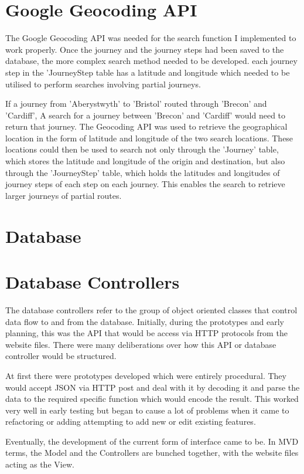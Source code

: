 \section{Google Geocoding API}
	The Google Geocoding API\cite{google_geocoding_api} was needed for the search function I implemented to work properly. Once the journey and the journey steps had been saved to the database, the more complex search method needed to be developed. each journey step in the 'Journey\textunderscore Step table has a latitude and longitude which needed to be utilised to perform searches involving partial journeys. 
	
	If a journey from 'Aberystwyth' to 'Bristol' routed through 'Brecon' and 'Cardiff', A search for a journey between 'Brecon' and 'Cardiff' would need to return that journey. The Geocoding API was used to retrieve the geographical location in the form of latitude and longitude of the two search locations. These locations could then be used to search not only through the 'Journey' table, which stores the latitude and longitude of the origin and destination, but also through the 'Journey\textunderscore Step' table, which holds the latitudes and longitudes of journey steps of each step on each journey. This enables the search to retrieve larger journeys of partial routes.
	
\section{Database}	
	
\section{Database Controllers}
	The database controllers refer to the group of object oriented classes that control data flow to and from the database. Initially, during the prototypes and early planning, this was the API that would be access via HTTP protocols from the website files. There were many deliberations over how this API or database controller would be structured.
	
	At first there were prototypes developed which were entirely procedural. They would accept JSON via HTTP post and deal with it by decoding it and parse the data to the required specific function which would encode the result. This worked very well in early testing but began to cause a lot of problems when it came to refactoring or adding attempting to add new or edit existing features.
	
	Eventually, the development of the current form of interface came to be. In MVD terms, the Model and the Controllers are bunched together, with the website files acting as the View.
	
